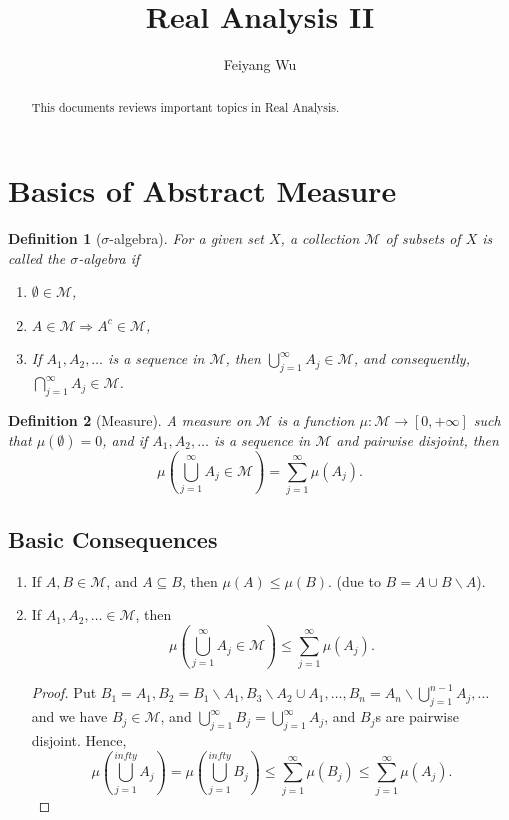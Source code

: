 \documentclass{tufte-handout}
\title{Real Analysis II}
\author[Feiyang Wu]{Feiyang Wu}
\newtheorem{definition}{Definition}[section]
\begin{document}
\setcounter{section}{1} 

\maketitle%

\begin{abstract}
\noindent This documents reviews important topics in Real Analysis.
\end{abstract}

\section{Basics of Abstract Measure}
\begin{definition}[$\sigma$-algebra]
    For a given set $X$, a collection $\mathcal{M}$ of subsets of $X$ is called the $\sigma$-algebra if 
    \begin{enumerate}
        \item $\emptyset\in \mathcal{M}$,
        \item $A\in \mathcal{M} \Rightarrow A^c \in \mathcal{M}$,
        \item If $A_1, A_2, \dots$ is a sequence in $\mathcal{M}$, then $\bigcup^\infty_{j=1}A_j \in \mathcal{M}$, and consequently, $\bigcap^\infty_{j=1}A_j \in \mathcal{M}$.
    \end{enumerate}
\end{definition}

\begin{definition}[Measure]
    A measure on $\mathcal{M}$ is a function $\mu:\mathcal{M} \rightarrow [0,+\infty]$ such that $\mu(\emptyset)=0$, and if $A_1, A_2, \dots$ is a sequence in $\mathcal{M}$ and pairwise disjoint, then 
    \[
    \mu\left(\bigcup^\infty_{j=1}A_j \in \mathcal{M}\right) = \sum^{\infty}_{j=1} \mu(A_j).
    \]
\end{definition}
\subsection{Basic Consequences}
\begin{enumerate}
    \item If $A,B\in \mathcal{M}$, and $A\subseteq B$, then $\mu(A) \leq \mu(B)$. (due to $B=A\cup B\backslash A$).
    \item If $A_1, A_2, \dots \in \mathcal{M}$, then 
    \[
    \mu\left(\bigcup^\infty_{j=1}A_j \in \mathcal{M}\right)
    \leq 
    \sum^{\infty}_{j=1} \mu(A_j).
    \]
    \begin{proof}
        Put $B_1=A_1, B_2=B_1\backslash A_1, B_3\backslash A_2\cup A_1, \dots, B_n=A_n\backslash \bigcup^{n-1}_{j=1}A_j,\dots$ and we have $B_j\in \mathcal{M}$, and $\bigcup^{\infty}_{j=1} B_j = \bigcup^{\infty}_{j=1} A_j$, and $B_j$s are pairwise disjoint. Hence,
        \[
        \mu \left( \bigcup^{infty}_{j=1} A_j \right)
        =\mu \left( \bigcup^{infty}_{j=1} B_j \right) \leq 
        \sum^{\infty}_{j=1} \mu(B_j) \leq \sum^{\infty}_{j=1} \mu(A_j).
        \]
    \end{proof}
\end{enumerate}
\end{document}
